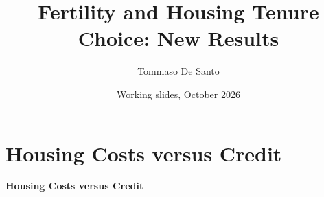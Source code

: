 
\title{Fertility and Housing Tenure Choice: New Results}
\author{Tommaso De Santo}
\date{Working slides, October 2026}

{
\maketitle
}
\section{Housing Costs versus Credit}
\begin{frame}{}
\centering
{\Large\textbf{Housing Costs versus Credit}}
\end{frame}


